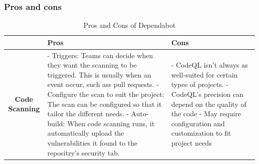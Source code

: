 \subsubsection{Pros and cons}
\begin{table}[H]
\centering
\begin{tabular}{|c|p{6cm}|p{6cm}|}
\hline
 & \textbf{Pros} & \textbf{Cons} \\
\hline
\textbf{Code Scanning} & 
- Triggers: Teams can decide when they want the scanning to be triggered. This is usually when an event occur, such ass pull requests.  \newline
- Configure the scan to suit the project: The scan can be configured so that it tailor the 
  different needs. \newline
- Auto-build: When code scanning runs, it automatically upload the vulnerabilities it found to the repositry's security tab. &
- CodeQL isn't always as well-suited for certain types of projects. \newline
- CodeQL's precision can depend on the quality of the code\newline
- May require configuration and customization to fit project needs \\
\hline
\end{tabular}
\caption{Pros and Cons of Dependabot}
\label{tab:Code Scanning}
\end{table}


